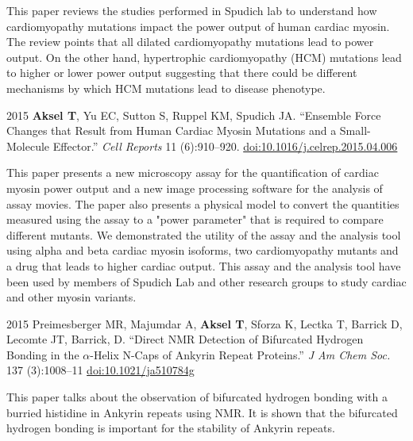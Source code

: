\documentclass[12pt,letterpaper]{report}
\begin{document}
\begin{tablist}
        \begin{addmargin}[1cm]{0cm}
            This paper reviews the studies performed in Spudich lab to understand how cardiomyopathy mutations impact the power output of human cardiac myosin. The review points that all dilated cardiomyopathy mutations lead to power output. On the other hand, hypertrophic cardiomyopathy (HCM) mutations  lead to higher or lower power output suggesting that there could be different mechanisms by which HCM mutations lead to disease phenotype.         
        \end{addmargin}

        \item[2015] \tab{}\textbf{Aksel T}, Yu EC, Sutton S, Ruppel KM, Spudich JA. \enquote{Ensemble Force Changes that Result from Human Cardiac Myosin Mutations and a Small-Molecule Effector.} \textit{Cell Reports} 11 (6):910--920. \href{https://doi.org/10.1016/j.celrep.2015.04.006}{doi:10.1016/j.celrep.2015.04.006}
        
        \begin{addmargin}[1cm]{0cm}
            This paper presents a new microscopy assay for the quantification of cardiac myosin power output and a new image processing software for the analysis of assay movies. The paper also presents a physical model to convert the quantities measured using the assay to a "power parameter" that is required to compare different mutants. We demonstrated the utility of the assay and the analysis tool using alpha and beta cardiac myosin isoforms, two cardiomyopathy mutants and a drug that leads to higher cardiac output. This assay and the analysis tool have been used by members of Spudich Lab and other research groups to study cardiac and other myosin variants.   
        \end{addmargin}

        \item[2015] \tab{}Preimesberger MR, Majumdar A, \textbf{Aksel T}, Sforza K, Lectka T, Barrick D, Lecomte JT, Barrick, D. \enquote{Direct NMR Detection of Bifurcated Hydrogen Bonding in the $\alpha$-Helix N-Caps of Ankyrin Repeat Proteins.} \textit{J Am Chem Soc.} 137 (3):1008--11 \href{https://doi.org/10.1021/ja510784g}{doi:10.1021/ja510784g}
        
        \begin{addmargin}[1cm]{0cm}
            This paper talks about the observation of bifurcated hydrogen bonding with a burried histidine in Ankyrin repeats using NMR. It is shown that the bifurcated hydrogen bonding is important for the stability of Ankyrin repeats.     
        \end{addmargin}
       

\end{tablist}
\end{document}
